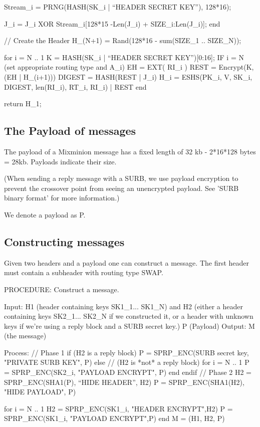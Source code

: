        Stream_i = PRNG(HASH(SK_i | ``HEADER SECRET KEY''), 128*16);

	J_i = J_i XOR Stream_i[128*15 -Len(J_i) + SIZE_i:Len(J_i)];
  end

  // Create the Header
  H_(N+1) = Rand(128*16 - sum(SIZE_1 .. SIZE_N));

  for i = N .. 1
	K = HASH(SK_i | ``HEADER SECRET KEY'')[0:16];
	IF i = N (set appropriate routing type and A_i)
	EH = EXT( RI_i )
        REST = Encrypt(K, (EH | H_(i+1)))
  	DIGEST = HASH(REST | J_i)
	H_i = ESHS(PK_i, V, SK_i, DIGEST, len(RI_i), RT_i, RI_i) | REST
  end

return H_1;

\subsection{The Payload of messages}

The payload of a Mixminion message has a fixed length of 32 kb
- 2*16*128 bytes = 28kb.   Payloads indicate their size.

(When sending a reply message with a SURB, we use payload encryption
to prevent the crossover point from seeing an unencrypted payload. See
'SURB binary format' for more information.)

We denote a payload as P.

\subsection{Constructing messages}

Given two headers and a payload one can construct a
message. The first header must contain a subheader
with routing type SWAP.  

PROCEDURE: Construct a message.

Input: H1 (header containing keys SK1_1... SK1_N)
       and H2 (either a header containing keys SK2_1... SK2_N if
         we constructed it, or a header with unknown keys if we're
         using a reply block and a SURB secret key.)
       P (Payload)
Output: M (the message)

Process:
        // Phase 1
        if (H2 is a reply block)
                P = SPRP_ENC(SURB secret key, "PRIVATE SURB KEY", P)
	else // (H2 is *not* a reply block)
		for i = N .. 1
	            P = SPRP_ENC(SK2_i, "PAYLOAD ENCRYPT", P)
		end
        endif
	// Phase 2
	H2 = SPRP_ENC(SHA1(P), ``HIDE HEADER'', H2)
        P = SPRP_ENC(SHA1(H2), "HIDE PAYLOAD", P)

	for i = N .. 1
		H2 = SPRP_ENC(SK1_i, "HEADER ENCRYPT",H2)
		P = SPRP_ENC(SK1_i, "PAYLOAD ENCRYPT",P)
	end
	M = (H1, H2, P)

